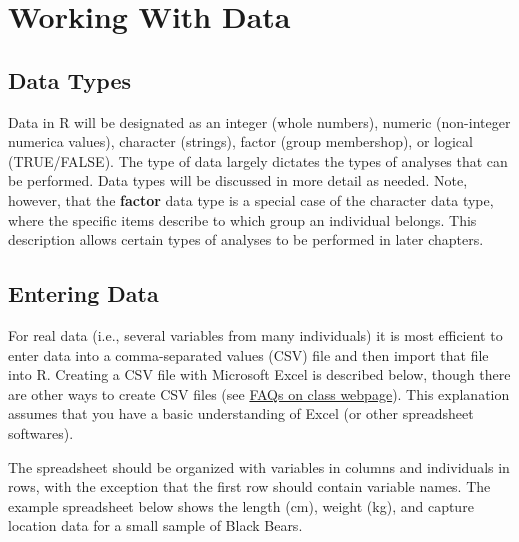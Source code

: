 \documentclass[10pt,openany]{book}\usepackage[]{graphicx}\usepackage[]{color}
\begin{document}
\vspace{-12pt}


\section{Working With Data}
\subsection{Data Types}  \label{sect:RDataTypes}
Data in R will be designated as an integer (whole numbers), numeric (non-integer numerica values), character (strings), factor (group membershop), or logical (TRUE/FALSE).  The type of data largely dictates the types of analyses that can be performed.  Data types will be discussed in more detail as needed.  Note, however, that the \textbf{factor} data type is a special case of the character data type, where the specific items describe to which group an individual belongs.  This description allows certain types of analyses to be performed in later chapters.


\subsection{Entering Data}  \label{sect:REnterData}
For real data (i.e., several variables from many individuals) it is most efficient to enter data into a comma-separated values (CSV) file and then import that file into R.  Creating a CSV file with Microsoft Excel is described below, though there are other ways to create CSV files (see \href{http://derekogle.com/NCMTH107/resources/FAQ/}{FAQs on class webpage}).  This explanation assumes that you have a basic understanding of Excel (or other spreadsheet softwares).


The spreadsheet should be organized with variables in columns and individuals in rows, with the exception that the first row should contain variable names.  The example spreadsheet below shows the length (cm), weight (kg), and capture location data for a small sample of Black Bears.
\end{document}
